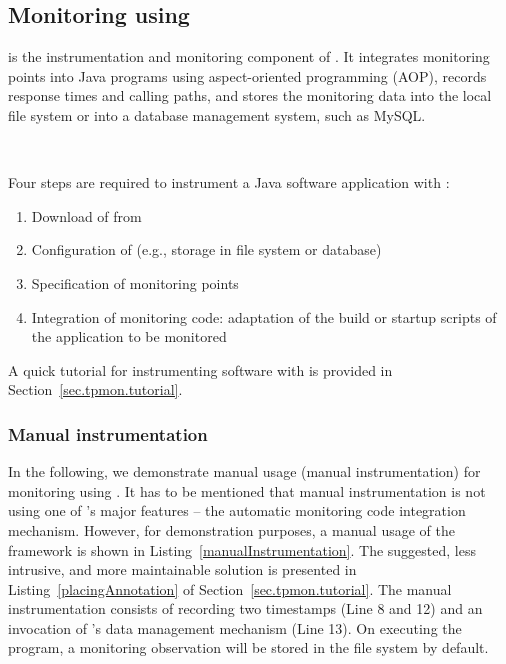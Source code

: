 \documentclass[a4paper,12pt]{scrartcl}
\begin{document}
\subsection{Monitoring using \tpmon{}}

\tpmon{} is the instrumentation and monitoring component of \kieker{}. It integrates monitoring points into Java programs using aspect-oriented programming (AOP), records response times and calling paths, and stores the monitoring data into the local file system or into a database management system, such as MySQL.

\

Four steps are required to instrument a Java software application with \tpmon{}:
\begin{enumerate}
\item Download of \tpmon{} from \kiekerurl{}
\item Configuration of \tpmon{} (e.g., storage in file system or database)
\item Specification of monitoring points
\item Integration of monitoring code: adaptation of the build or startup scripts of the application to be monitored
\end{enumerate}

\noindent
A quick tutorial for instrumenting software with \tpmon{} is provided in Section~\ref{sec.tpmon.tutorial}.

\subsubsection{Manual instrumentation}
In the following, we demonstrate manual usage (manual instrumentation) for monitoring using \tpmon{}. It has to be mentioned that manual instrumentation is not using one of \tpmon{}'s major features -- the automatic monitoring code integration mechanism. However, for demonstration purposes, a manual usage of the \tpmon{} framework is shown in Listing~\ref{manualInstrumentation}. The suggested, less intrusive, and more maintainable solution is presented in Listing~\ref{placingAnnotation} of Section~\ref{sec.tpmon.tutorial}. The manual instrumentation consists of recording two timestamps (Line 8 and 12) and an invocation of \tpmon{}'s data management mechanism (Line 13). On executing the program, a monitoring observation will be stored in the file system by default.
\end{document}
